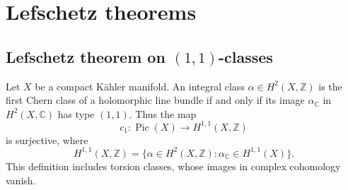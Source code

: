 \section{Lefschetz theorems}
\label{section-lefschetz-theorems}

\subsection{Lefschetz theorem on
$(1,1)$-classes}
\label{subsection-lefschetz-11}

\begin{theorem}
\label{theorem-11-classes}
Let $X$ be a compact Kähler manifold.
An integral class
$\alpha\in H^2(X,\mathbb{Z})$
is the first Chern class of a
holomorphic line bundle if and only if
its image $\alpha_{\mathbb{C}}$ in
$H^2(X,\mathbb{C})$ has type $(1,1)$.
Thus the map
$$
c_1:\operatorname{Pic}(X)
\longrightarrow H^{1,1}(X,\mathbb{Z})
$$
is surjective, where
$$
H^{1,1}(X,\mathbb{Z})
=\{\alpha\in H^2(X,\mathbb{Z}):
\alpha_{\mathbb{C}}\in H^{1,1}(X)\}.
$$
This definition includes torsion classes,
whose images in complex cohomology vanish.
\end{theorem}

